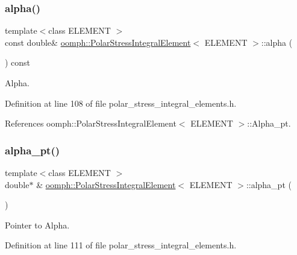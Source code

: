 \subsubsection{\texorpdfstring{alpha()}{alpha()}}
{\footnotesize\ttfamily template$<$class E\+L\+E\+M\+E\+NT $>$ \\
const double\& \hyperlink{classoomph_1_1PolarStressIntegralElement}{oomph\+::\+Polar\+Stress\+Integral\+Element}$<$ E\+L\+E\+M\+E\+NT $>$\+::alpha (\begin{DoxyParamCaption}{ }\end{DoxyParamCaption}) const\hspace{0.3cm}{\ttfamily [inline]}}



Alpha. 



Definition at line 108 of file polar\+\_\+stress\+\_\+integral\+\_\+elements.\+h.



References oomph\+::\+Polar\+Stress\+Integral\+Element$<$ E\+L\+E\+M\+E\+N\+T $>$\+::\+Alpha\+\_\+pt.

\mbox{\label{classoomph_1_1PolarStressIntegralElement_a8b0c1571618a9eb746769089d37c2b10}} 
\subsubsection{\texorpdfstring{alpha\+\_\+pt()}{alpha\_pt()}}
{\footnotesize\ttfamily template$<$class E\+L\+E\+M\+E\+NT $>$ \\
double$\ast$ \& \hyperlink{classoomph_1_1PolarStressIntegralElement}{oomph\+::\+Polar\+Stress\+Integral\+Element}$<$ E\+L\+E\+M\+E\+NT $>$\+::alpha\+\_\+pt (\begin{DoxyParamCaption}{ }\end{DoxyParamCaption})\hspace{0.3cm}{\ttfamily [inline]}}



Pointer to Alpha. 



Definition at line 111 of file polar\+\_\+stress\+\_\+integral\+\_\+elements.\+h.



